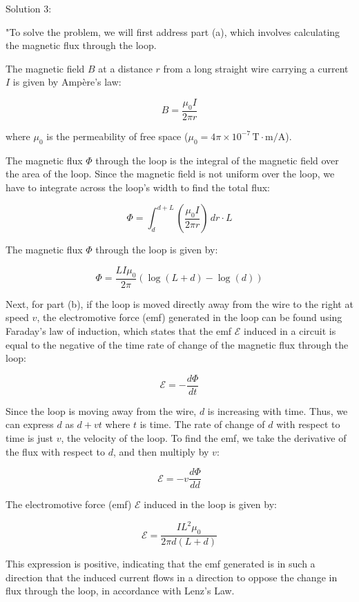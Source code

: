 Solution 3: 

"To solve the problem, we will first address part (a), which involves calculating the magnetic flux through the loop.

The magnetic field \( B \) at a distance \( r \) from a long straight wire carrying a current \( I \) is given by Ampère's law:

\[
B = \frac{\mu_0 I}{2\pi r}
\]

where \( \mu_0 \) is the permeability of free space (\( \mu_0 = 4\pi \times 10^{-7} \, \text{T} \cdot \text{m/A} \)).

The magnetic flux \( \Phi \) through the loop is the integral of the magnetic field over the area of the loop. Since the magnetic field is not uniform over the loop, we have to integrate across the loop's width to find the total flux:

\[
\Phi = \int_{d}^{d+L} \left( \frac{\mu_0 I}{2\pi r} \right) \, dr \cdot L
\]

The magnetic flux \( \Phi \) through the loop is given by:

\[
\Phi = \frac{L I \mu_0}{2\pi} \left( \log(L + d) - \log(d) \right)
\]

Next, for part (b), if the loop is moved directly away from the wire to the right at speed \( v \), the electromotive force (emf) generated in the loop can be found using Faraday's law of induction, which states that the emf \( \mathcal{E} \) induced in a circuit is equal to the negative of the time rate of change of the magnetic flux through the loop:

\[
\mathcal{E} = -\frac{d\Phi}{dt}
\]

Since the loop is moving away from the wire, \( d \) is increasing with time. Thus, we can express \( d \) as \( d + vt \) where \( t \) is time. The rate of change of \( d \) with respect to time is just \( v \), the velocity of the loop. To find the emf, we take the derivative of the flux with respect to \( d \), and then multiply by \( v \):

\[
\mathcal{E} = -v \frac{d\Phi}{dd}
\]

The electromotive force (emf) \(\mathcal{E}\) induced in the loop is given by:

\[
\mathcal{E} = \frac{I L^2 \mu_0}{2\pi d (L + d)}
\]

This expression is positive, indicating that the emf generated is in such a direction that the induced current flows in a direction to oppose the change in flux through the loop, in accordance with Lenz's Law.

